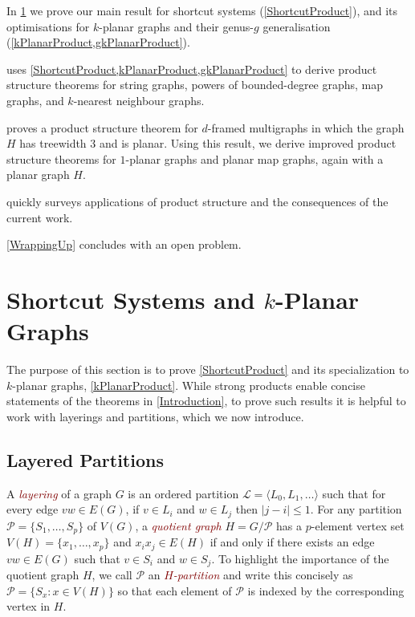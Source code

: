 \documentclass{patmorin}
\theoremstyle{plain}
\theoremstyle{definition}
\newcommand{\defin}[1]{\textcolor{Maroon}{\emph{#1}}}
\newcommand{\note}[2]{\noindent{\color{red}[#1:~#2]}}
\newcommand{\PP}{\mathcal{P}}
\renewcommand{\leq}{\leqslant}
\begin{document}
\begin{compactitem}
  \item In \cref{Structure} we prove our main result for shortcut systems (\cref{ShortcutProduct}), and its optimisations for $k$-planar graphs and their genus-$g$ generalisation (\cref{kPlanarProduct,gkPlanarProduct}).
  \item {} uses \cref{ShortcutProduct,kPlanarProduct,gkPlanarProduct} to derive product structure theorems for string graphs, powers of bounded-degree graphs, map graphs, and $k$-nearest neighbour graphs.
  \item {} proves a product structure theorem for $d$-framed multigraphs in which the graph $H$ has treewidth $3$ and is planar.  Using this result, we derive improved product structure theorems for $1$-planar graphs and planar map graphs, again with a planar graph $H$.
  \item {} quickly surveys applications of product structure and the consequences of the current work.
  \item \cref{WrappingUp} concludes with an open problem.
\end{compactitem}




\section{\boldmath Shortcut Systems and $k$-Planar Graphs}
\label{Structure}

The purpose of this section is to prove \cref{ShortcutProduct} and its specialization to $k$-planar graphs, \cref{kPlanarProduct}.
While strong products enable concise statements of the theorems in \cref{Introduction}, to prove such results it is helpful to work with layerings and partitions, which we now introduce.

\subsection{Layered Partitions}

A \defin{layering} of a graph $G$
is an ordered partition $\mathcal{L}=\langle L_0,L_1,\ldots\rangle $ such that for every edge
$vw\in E(G)$, if $v\in L_i$ and $w\in L_j$ then $|j-i|\leq 1$.  For any partition $\PP=\{S_1,\ldots,S_p\}$ of $V(G)$, a \defin{quotient graph} $H=G/\PP$ has a $p$-element vertex set $V(H)=\{x_1,\ldots,x_p\}$ and $x_ix_j\in E(H)$ if and only if there exists an edge $vw\in E(G)$ such that $v\in S_i$ and $w\in S_j$. To highlight the importance of the quotient graph $H$, we call $\PP$ an \defin{$H$-partition} and write this concisely as $\PP=\{S_x : x\in V(H)\}$ so that each element of $\PP$ is indexed by the corresponding vertex in $H$.
\end{document}

